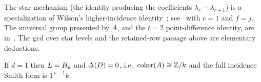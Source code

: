 The star mechanism (the identity producing the coefficients
$\lambda_r-\lambda_{r+1}$) is a specialization of Wilson's higher-incidence
identity~\cite{Wilson1982}; see~\cite[Section 2.2, equation (2.1)]{KiermaierWassermann}
with $e=1$ and $f=j$. The universal group presented by $A$, and the $t=2$
point-difference identity, are in~\cite[Section 2]{CFP2017}. The gcd over
star levels and the retained-row passage above are elementary deductions.

\begin{corollary}\label{cor:d1}
If $d=1$ then $L=H_k$ and $\Delta(D)=0$, i.e.\ $\operatorname{coker}(A)\cong\mathbb{Z}/k$ and the full
incidence Smith form is $1^{\,v-1}k$.
\end{corollary}
